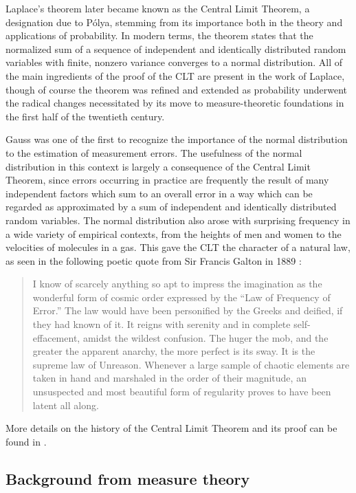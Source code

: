 \documentclass{svjour3}
\begin{document}
Laplace's theorem later became known as the Central Limit Theorem, a designation due to P\'olya, stemming from its importance both in the theory and applications of probability. In modern terms, the theorem states that the normalized sum of a sequence of independent and identically distributed random variables with finite, nonzero variance converges to a normal distribution. All of the main ingredients of the proof of the CLT are present in the work of Laplace, though of course the theorem was refined and extended as probability underwent the radical changes necessitated by its move to measure-theoretic foundations in the first half of the twentieth century.

Gauss was one of the first to recognize the importance of the normal distribution to the estimation of measurement errors. The usefulness of the normal distribution in this context is largely a consequence of the Central Limit Theorem, since errors occurring in practice are frequently the result of many independent factors which sum to an overall error in a way which can be regarded as approximated by a sum of independent and identically distributed random variables. The normal distribution also arose with surprising frequency in a wide variety of empirical contexts, from the heights of men and women to the velocities of molecules in a gas. This gave the CLT the character of a natural law, as seen in the following poetic quote from Sir Francis Galton in 1889 \cite{galton:89}:
\begin{quote}
 I know of scarcely anything so apt to impress the imagination as the wonderful form of cosmic order expressed by the ``Law of Frequency of Error.'' The law would have been personified by the Greeks and deified, if they had known of it. It reigns with serenity and in complete self-effacement, amidst the wildest confusion. The huger the mob, and the greater the apparent anarchy, the more perfect is its sway. It is the supreme law of Unreason. Whenever a large sample of chaotic elements are taken in hand and marshaled in the order of their magnitude, an unsuspected and most beautiful form of regularity proves to have been latent all along.
\end{quote}
More details on the history of the Central Limit Theorem and its proof can be found in \cite{fischer:11}.

\subsection{Background from measure theory}
\label{subsection:background}
\end{document}
